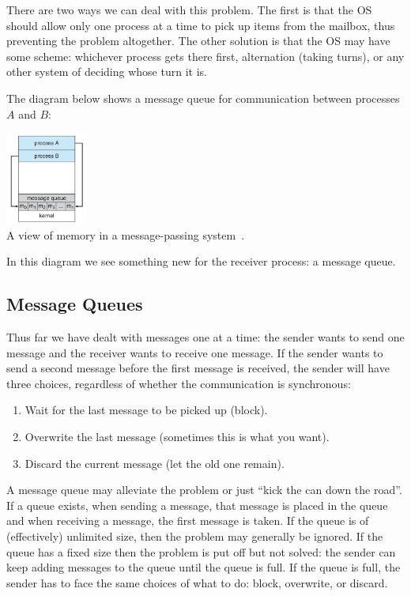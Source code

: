 There are two ways we can deal with this problem. The first is that the OS should allow only one process at a time to pick up items from the mailbox, thus preventing the problem altogether. The other solution is that the OS may have some scheme: whichever process gets there first, alternation (taking turns), or any other system of deciding whose turn it is.

The diagram below shows a message queue for communication between processes $A$ and $B$:
\begin{center}
	\includegraphics[width=0.2\textwidth]{images/message-passing.png}\\
	A view of memory in a message-passing system~\cite{osc}.
\end{center}

In this diagram we see something new for the receiver process: a message queue.

\subsection*{Message Queues}

Thus far we have dealt with messages one at a time: the sender wants to send one message and the receiver wants to receive one message. If the sender wants to send a second message before the first message is received, the sender will have three choices, regardless of whether the communication is synchronous:

\begin{enumerate}
	\item Wait for the last message to be picked up (block).
	\item Overwrite the last message (sometimes this is what you want).
	\item Discard the current message (let the old one remain).
\end{enumerate}

A message queue may alleviate the problem or just ``kick the can down the road''. If a queue exists, when sending a message, that message is placed in the queue and when receiving a message, the first message is taken. If the queue is of (effectively) unlimited size, then the problem may generally be ignored. If the queue has a fixed size then the problem is put off but not solved: the sender can keep adding messages to the queue until the queue is full. If the queue is full, the sender has to face the same choices of what to do: block, overwrite, or discard.

